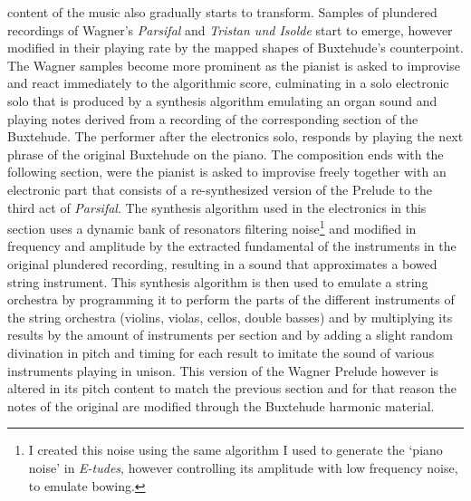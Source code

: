 content of the music also gradually starts to transform. Samples of plundered recordings of Wagner's \emph{Parsifal} and \emph{Tristan und Isolde} start to emerge, however modified in their playing rate by the mapped shapes of Buxtehude's counterpoint. The Wagner samples become more prominent as the pianist is asked to improvise and react immediately to the algorithmic score, culminating in a solo electronic solo that is produced by a synthesis algorithm emulating an organ sound and playing notes derived from a recording of the corresponding section of the Buxtehude. The performer after the electronics solo, responds by playing the next phrase of the original Buxtehude on the piano. The composition ends with the following section, were the pianist is asked to improvise freely together with an electronic part that consists of a re-synthesized version of the Prelude to the third act of \emph{Parsifal}. The synthesis algorithm used in the electronics in this section uses a dynamic bank of resonators filtering noise\footnote{I created this noise using the same algorithm I used to generate the `piano noise' in \emph{E-tudes}, however controlling its amplitude with low frequency noise, to emulate bowing.} and modified in frequency and amplitude by the extracted fundamental of the instruments in the original plundered recording, resulting in a sound that approximates a bowed string instrument. This synthesis algorithm is then used to emulate a string orchestra by programming it to perform the parts of the different instruments of the string orchestra (violins, violas, cellos, double basses) and by multiplying its results by the amount of instruments per section and by adding a slight random divination in pitch and timing for each result to imitate the sound of various instruments playing in unison. This version of the Wagner Prelude however is altered in its pitch content to match the previous section and for that reason the notes of the original are modified through the Buxtehude harmonic material. 
 
